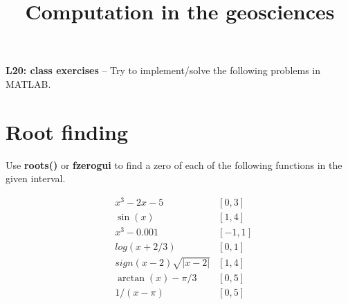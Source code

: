 \documentclass[10pt,fleqn]{article}
\title{Computation in the geosciences}
\date{\empty}
\begin{document}
\textbf{L20: class exercises} -- Try to implement/solve the following problems in MATLAB.

\section*{Root finding}

Use \textbf{roots()} or \textbf{fzerogui} to find a zero of each of the following functions in the given interval. 

\begin{eqnarray} \nonumber
& x^3 - 2x - 5 & [0,3] \\ \nonumber
& \sin(x) & [1,4]  \\ \nonumber
& x^3 - 0.001 & [-1,1] \\ \nonumber
& log(x+2/3) & [0,1] \\ \nonumber
& sign(x-2)\sqrt{|x-2|} & [1,4] \\ \nonumber
& \arctan(x) - \pi/3 & [0,5] \\ \nonumber
& 1/(x-\pi) & [0,5] \\ \nonumber
\end{eqnarray}
\end{document}
